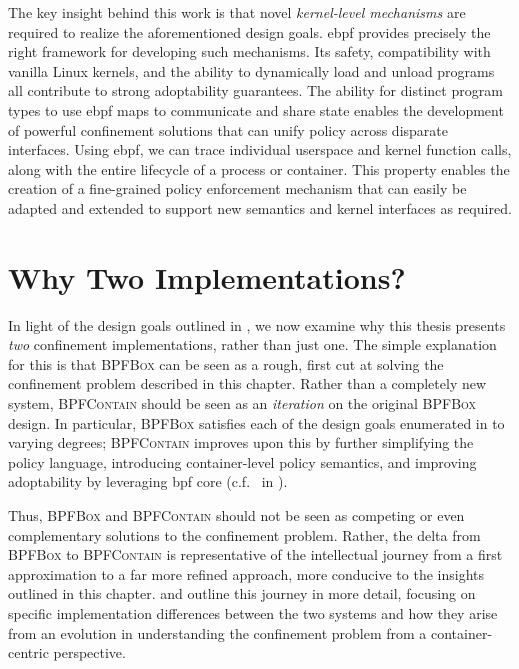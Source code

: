 \documentclass[
  fontsize=12pt,
  titlepage=firstiscover,
  paper=letter,
oneside,
  cleardoublepage=plain,
  parskip=half-,
  DIV=10,
  parindent,
  appendixprefix,
  chapterprefix,
  listof=totoc,
]{scrbook}
\newcommand{\bpfbox}{\textsc{BPFBox}}
\newcommand{\bpfcontain}{\textsc{BPFContain}}
\begin{document}
The key insight behind this work is that novel \textit{kernel-level mechanisms} are
required to realize the aforementioned design goals. \gls{ebpf} provides precisely the
right framework for developing such mechanisms. Its safety, compatibility with vanilla
Linux kernels, and the ability to dynamically load and unload programs all contribute to
strong adoptability guarantees. The ability for distinct program types to use \gls{ebpf}
maps to communicate and share state enables the development of powerful confinement
solutions that can unify policy across disparate interfaces. Using \gls{ebpf}, we can
trace individual userspace and kernel function calls, along with the entire lifecycle of
a process or container. This property enables the creation of a fine-grained policy
enforcement mechanism that can easily be adapted and extended to support new semantics and
kernel interfaces as required.



\section{Why Two Implementations?}
\label{s:cp-why-two}

In light of the design goals outlined in , we now examine why this
thesis presents \textit{two} confinement implementations, rather than just one. The simple
explanation for this is that \bpfbox{} can be seen as a rough, first cut at solving the
confinement problem described in this chapter. Rather than a completely new system,
\bpfcontain{} should be seen as an \textit{iteration} on the original \bpfbox{} design.
In particular, \bpfbox{} satisfies each of the design goals enumerated in
 to varying degrees; \bpfcontain{} improves upon this by further
simplifying the policy language, introducing container-level policy semantics, and
improving adoptability by leveraging \gls{bpf} \gls{core} (c.f.\  in
).

Thus, \bpfbox{} and \bpfcontain{} should not be seen as competing or even complementary
solutions to the confinement problem. Rather, the delta from \bpfbox{} to \bpfcontain{} is
representative of the intellectual journey from a first approximation to a far more
refined approach, more conducive to the insights outlined in this chapter. 
and  outline this journey in more detail, focusing on specific implementation
differences between the two systems and how they arise from an evolution in understanding
the confinement problem from a container-centric perspective.
\end{document}
